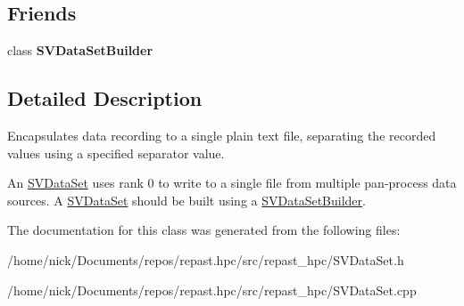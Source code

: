 \subsection*{Friends}
\begin{DoxyCompactItemize}
\item 
\hypertarget{classrepast_1_1_s_v_data_set_a4e3439f25e70c1f10ce7e842f97bc314}{class {\bfseries S\-V\-Data\-Set\-Builder}}\label{classrepast_1_1_s_v_data_set_a4e3439f25e70c1f10ce7e842f97bc314}

\end{DoxyCompactItemize}


\subsection{Detailed Description}
Encapsulates data recording to a single plain text file, separating the recorded values using a specified separator value. 

An \hyperlink{classrepast_1_1_s_v_data_set}{S\-V\-Data\-Set} uses rank 0 to write to a single file from multiple pan-\/process data sources. A \hyperlink{classrepast_1_1_s_v_data_set}{S\-V\-Data\-Set} should be built using a \hyperlink{classrepast_1_1_s_v_data_set_builder}{S\-V\-Data\-Set\-Builder}. 

The documentation for this class was generated from the following files\-:\begin{DoxyCompactItemize}
\item 
/home/nick/\-Documents/repos/repast.\-hpc/src/repast\-\_\-hpc/S\-V\-Data\-Set.\-h\item 
/home/nick/\-Documents/repos/repast.\-hpc/src/repast\-\_\-hpc/S\-V\-Data\-Set.\-cpp\end{DoxyCompactItemize}
